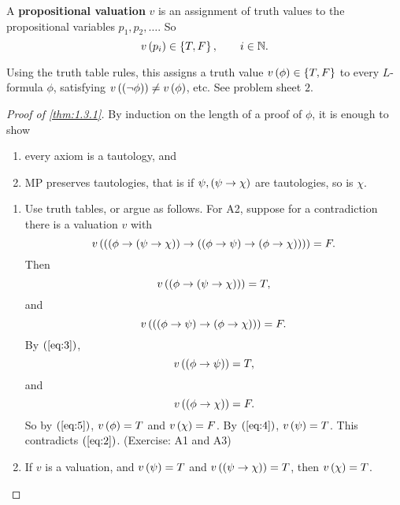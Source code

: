 \begin{definition}
A \textbf{propositional valuation} $ v $ is an assignment of truth values to the propositional variables $ p_1, p_2, \dots $. So
$$ v\left( p_i \right) \in \left\{ T, F \right\}, \qquad i \in \mathbb{N}. $$
\end{definition}

\begin{note}
Using the truth table rules, this assigns a truth value $ v\left( \phi \right) \in \left\{ T, F \right\} $ to every $ L $-formula $ \phi $, satisfying $ v\left( \left( \neg \phi \right) \right) \ne v\left( \phi \right) $, etc. See problem sheet $ 2 $.
\end{note}

\begin{proof}[Proof of \ref{thm:1.3.1}]
By induction on the length of a proof of $ \phi $, it is enough to show
\begin{enumerate}
\item every axiom is a tautology, and
\item MP preserves tautologies, that is if $ \psi, \left( \psi \rightarrow \chi \right) $ are tautologies, so is $ \chi $.
\end{enumerate}
\begin{enumerate}
\item Use truth tables, or argue as follows. For A2, suppose for a contradiction there is a valuation $ v $ with
$$ v\left( \left( \left( \phi \rightarrow \left( \psi \rightarrow \chi \right) \right) \rightarrow \left( \left( \phi \rightarrow \psi \right) \rightarrow \left( \phi \rightarrow \chi \right) \right) \right) \right) = F. $$
Then
\begin{equation}
\label{eq:2}
v\left( \left( \phi \rightarrow \left( \psi \rightarrow \chi \right) \right) \right) = T,
\end{equation}
and
\begin{equation}
\label{eq:3}
v\left( \left( \left( \phi \rightarrow \psi \right) \rightarrow \left( \phi \rightarrow \chi \right) \right) \right) = F.
\end{equation}
By $ \left( \ref{eq:3} \right) $,
\begin{equation}
\label{eq:4}
v\left( \left( \phi \rightarrow \psi \right) \right) = T,
\end{equation}
and
\begin{equation}
\label{eq:5}
v\left( \left( \phi \rightarrow \chi \right) \right) = F.
\end{equation}
So by $ \left( \ref{eq:5} \right) $, $ v\left( \phi \right) = T $ and $ v\left( \chi \right) = F $. By $ \left( \ref{eq:4} \right) $, $ v\left( \psi \right) = T $. This contradicts $ \left( \ref{eq:2} \right) $. (Exercise: A1 and A3)
\item If $ v $ is a valuation, and $ v\left( \psi \right) = T $ and $ v\left( \left( \psi \rightarrow \chi \right) \right) = T $, then $ v\left( \chi \right) = T $.
\end{enumerate}
\end{proof}

